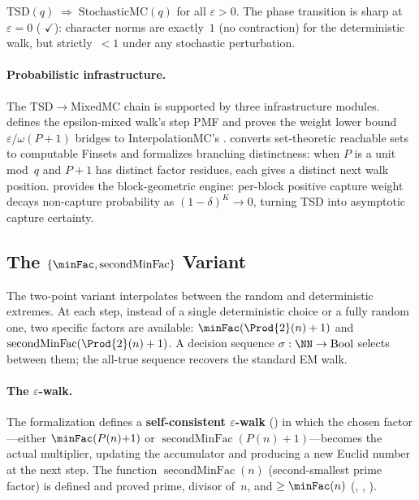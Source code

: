 \begin{theorem}
\label{thm:integer-stochastic-mc}
$\mathrm{TSD}(q) \;\Longrightarrow\; \mathrm{StochasticMC}(q)$ for all
$\varepsilon > 0$.  The phase transition is sharp at $\varepsilon = 0$
(
{\color{leanink}$\checkmark$}):
character norms are exactly~$1$ (no contraction) for the deterministic
walk, but strictly~$< 1$ under any stochastic perturbation.
\end{theorem}

\paragraph{Probabilistic infrastructure.}
The TSD$\to$MixedMC chain is supported by three infrastructure
modules.   defines the
epsilon-mixed walk's step PMF and proves the weight lower bound
$\varepsilon/\omega(P{+}1)$ bridges to InterpolationMC's
.   converts
set-theoretic reachable sets to computable Finsets and formalizes
branching distinctness: when $P$ is a unit mod~$q$ and $P{+}1$ has
distinct factor residues, each gives a distinct next walk position.
 provides the block-geometric
engine: per-block positive capture weight decays non-capture
probability as $(1{-}\delta)^K \to 0$, turning TSD into asymptotic
capture certainty.

\subsection{The $\{\minFac, \operatorname{secondMinFac}\}$ Variant}
\label{sec:minfac-secondminfac}

The two-point variant interpolates between the random and deterministic
extremes.  At each step, instead of a single deterministic choice or a
fully random one, two specific factors are available:
$\minFac(\Prod{2}(n)+1)$ and $\operatorname{secondMinFac}(\Prod{2}(n)+1)$.
A decision sequence $\sigma : \NN \to \mathrm{Bool}$ selects between
them; the all-true sequence recovers the standard EM walk.

\paragraph{The $\varepsilon$-walk.}
The formalization defines a
\textbf{self-consistent $\varepsilon$-walk}
()
in which the chosen factor---either $\minFac(P(n){+}1)$ or
$\operatorname{secondMinFac}(P(n){+}1)$---becomes the actual multiplier,
updating the accumulator and producing a new Euclid number at the next
step.
The function $\operatorname{secondMinFac}(n)$ (second-smallest prime
factor) is defined and proved prime, divisor of~$n$, and
$\geq \minFac(n)$
(,
,
).

